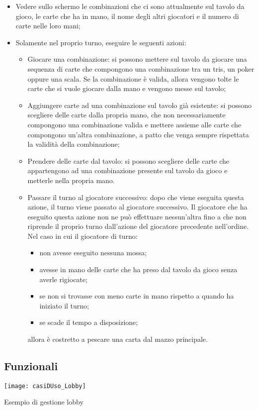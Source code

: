 \begin{itemize}
    \item Vedere sullo schermo le combinazioni che ci sono attualmente sul tavolo da gioco, le carte che ha in mano, il nome degli altri giocatori e il numero di carte nelle loro mani;
    \item Solamente nel proprio turno, eseguire le seguenti azioni:
    \begin{itemize}
        \item Giocare una combinazione: si possono mettere sul tavolo da giocare una sequenza di carte che compongono una combinazione tra un tris, un poker oppure una scala.
        Se la combinazione è valida, allora vengono tolte le carte che si vuole giocare dalla mano e vengono messe sul tavolo;
        \item Aggiungere carte ad una combinazione sul tavolo già esistente: si possono scegliere delle carte dalla propria mano, che non necessariamente compongono una combinazione valida e mettere assieme alle carte che compongono un’altra combinazione, a patto che venga sempre rispettata la validità della combinazione;
        \item Prendere delle carte dal tavolo: si possono scegliere delle carte che appartengono ad una combinazione presente sul tavolo da gioco e metterle nella propria mano.
        \item Passare il turno al giocatore successivo: dopo che viene eseguita questa azione, il turno viene passato al giocatore successivo.
        Il giocatore che ha eseguito questa azione non ne può effettuare nessun’altra fino a che non riprende il proprio turno dall’azione del giocatore precedente nell’ordine.
        Nel caso in cui il giocatore di turno:
        \begin{itemize}
            \item non avesse eseguito nessuna mossa;
            \item avesse in mano delle carte che ha preso dal tavolo da gioco senza averle rigiocate;
            \item se non si trovasse con meno carte in mano rispetto a quando ha iniziato il turno;
            \item se scade il tempo a disposizione;
        \end{itemize}
        allora è costretto a pescare una carta dal mazzo principale.
    \end{itemize}
\end{itemize}

\subsection{Funzionali}
\begin{center}
    \texttt{[image: casiDUso\_Lobby]}
\end{center}
\space
\hspace{4cm}Esempio di gestione lobby
